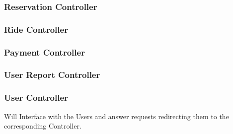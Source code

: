 \documentclass[a4paper]{article}
\begin{document}
\subsubsection{Reservation Controller}
\begin{figure}[h]
\centering
\vspace*{\fill}
\noindent{}%
\vspace*{0.1cm}
\end{figure}
\newpage

\subsubsection{Ride Controller}
\begin{figure}[h]
\centering
\vspace*{\fill}
\noindent{}%
\vspace*{0.1cm}
\end{figure}

\subsubsection{Payment Controller}
\begin{figure}[h]
\centering
\vspace*{\fill}
\noindent{}%
\vspace*{0.1cm}
\end{figure}

\subsubsection{User Report Controller}
\begin{figure}[h]
\centering
\vspace*{\fill}
\noindent{}%
\vspace*{0.1cm}
\end{figure}

\newpage
\subsubsection{User Controller}
Will Interface with the Users and answer requests redirecting them to the corresponding Controller.
\begin{figure}[h]
\centering
\vspace*{\fill}
\noindent{}%
\vspace*{0.1cm}
\end{figure}
\end{document}
